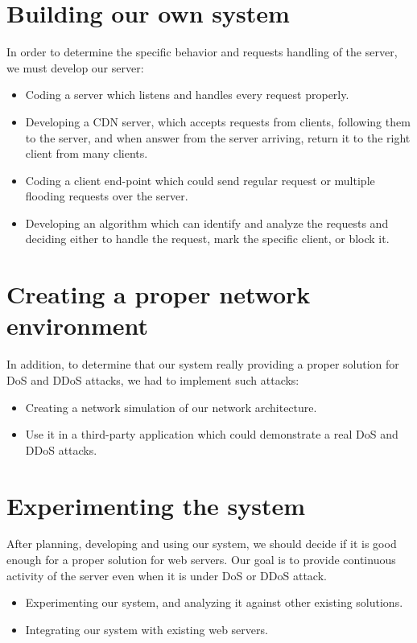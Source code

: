 \documentclass{report}
\begin{document}
\section {Building our own system}
In order to determine the specific behavior and requests handling of the server, we must develop our server:
\begin{itemize}
\item Coding a server which listens and handles every request properly.
\item Developing a \gls{CDN} server, which accepts requests from clients, following them to the server, and when answer from the server arriving, return it to the right client from many clients.
\item Coding a client end-point which could send regular request or multiple flooding requests over the server.
\item Developing an algorithm which can identify and analyze the requests and deciding either to handle the request, mark the specific client, or block it.
\end{itemize}
\section {Creating a proper network environment}
In addition, to determine that our system really providing a proper solution for \gls{DoS} and \gls{DDoS} attacks, we had to implement such attacks:
\begin{itemize}
\item Creating a network simulation of our network architecture.
\item Use it in a third-party application which could demonstrate a real \gls{DoS} and \gls{DDoS} attacks.
\end{itemize}
\section {Experimenting the system}
After planning, developing and using our system, we should decide if it is good enough for a proper solution for web servers. Our goal is to provide continuous activity of the server even when it is under \gls{DoS} or \gls{DDoS} attack.
\begin{itemize}
\item Experimenting our system, and analyzing it against other existing solutions.
\item Integrating our system with existing web servers.
\end{itemize}
\end{document}
